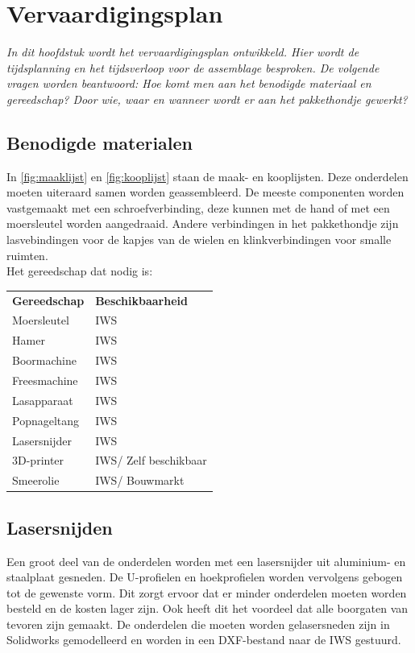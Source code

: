
\chapter{Vervaardigingsplan}
\label{Vervaardigingsplan}
\textit{In dit hoofdstuk wordt het vervaardigingsplan ontwikkeld. Hier wordt de tijdsplanning en het tijdsverloop voor de assemblage besproken. De volgende vragen worden beantwoord: Hoe komt men aan het benodigde materiaal en gereedschap? Door wie, waar en wanneer wordt er aan het pakkethondje gewerkt?}

\section{Benodigde materialen}
\label{Benodigde_materialen}
In \cref{fig:maaklijst} en \cref{fig:kooplijst} staan de maak- en kooplijsten. Deze onderdelen moeten uiteraard samen worden geassembleerd. De meeste componenten worden vastgemaakt met een schroefverbinding, deze kunnen met de hand of met een moersleutel worden aangedraaid. Andere verbindingen in het pakkethondje zijn lasvebindingen voor de kapjes van de wielen en klinkverbindingen voor smalle ruimten. \\
\vspace{\baselineskip}
Het gereedschap dat nodig is:
\begin{table}[H]
\begin{tabular}{ll}
\textbf{Gereedschap} & \textbf{Beschikbaarheid} \\
Moersleutel          & IWS                      \\
Hamer                & IWS                      \\
Boormachine          & IWS                      \\
Freesmachine         & IWS                      \\
Lasapparaat          & IWS                      \\
Popnageltang         & IWS                      \\
Lasersnijder         & IWS                      \\
3D-printer           & IWS/ Zelf beschikbaar    \\
Smeerolie            & IWS/ Bouwmarkt          
\end{tabular}
\end{table}

\section{Lasersnijden}
\label{se:lasersnijden}
Een groot deel van de onderdelen worden met een lasersnijder uit aluminium- en staalplaat gesneden. De U-profielen en hoekprofielen worden vervolgens gebogen tot de gewenste vorm. Dit zorgt ervoor dat er minder onderdelen moeten worden besteld en de kosten lager zijn. Ook heeft dit het voordeel dat alle boorgaten van tevoren zijn gemaakt. De onderdelen die moeten worden gelasersneden zijn in Solidworks gemodelleerd en worden in een DXF-bestand naar de IWS gestuurd.

